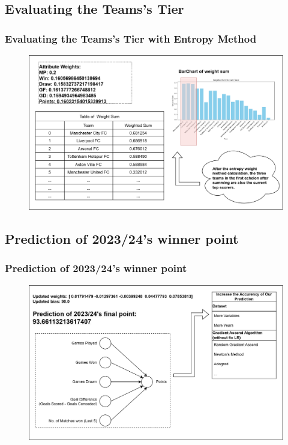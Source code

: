 \documentclass{beamer}
\begin{document}
\subsection{Evaluating the Teams's Tier}
\begin{frame}
  \frametitle{Evaluating the Teams's Tier with Entropy Method}
  \begin{figure}
    \includegraphics[width=\textwidth]{img/Entropy_output.png}
  \end{figure}
\end{frame}
% 
% 
% 
% 
% 
% 
\subsection{Prediction of 2023/24's winner point}
\begin{frame}
  \frametitle{Prediction of 2023/24's winner point}
  \begin{figure}
    \includegraphics[width=\textwidth]{img/prediction_current_year.png}
  \end{figure}
\end{frame}
% 
% 
% 
% 
% 
% 
% 
% 
\end{document}
